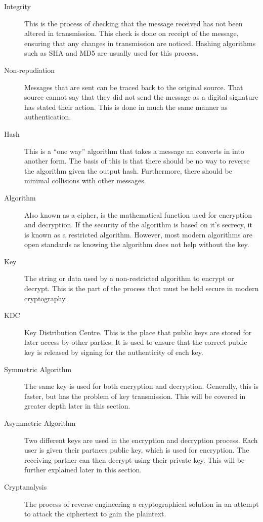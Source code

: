 \begin{description}
				\item[Integrity] 
					This is the process of checking that the message received has not been altered in transmission. 
					This check is done on receipt of the message, ensuring that any changes in transmission are noticed. 
					Hashing algorithms such as SHA and MD5 are usually used for this process. 
				\item[Non-repudiation]
					Messages that are sent can be traced back to the original source. 
					That source cannot say that they did not send the message as a digital signature has stated their action. 
					This is done in much the same manner as authentication. 
				\item[Hash]
					This is a ``one way'' algorithm that takes a message an converts in into another form. 
					The basis of this is that there should be no way to reverse the algorithm given the output hash. 
					Furthermore, there should be minimal collisions with other messages. 
				\item[Algorithm] Also known as a cipher, is the mathematical function used for encryption and decryption. 
					If the security of the algorithm is based on it's secrecy, it is known as a restricted algorithm. 
					However, most modern algorithms are open standards as knowing the algorithm does not help without the key. 
				\item[Key] The string or data used by a non-restricted algorithm to encrypt or decrypt. 
					This is the part of the process that must be held secure in modern cryptography. 
				\item[KDC] Key Distribution Centre. 
					This is the place that public keys are stored for later access by other parties. 
					It is used to ensure that the correct public key is released by signing for the authenticity of each key. 
				\item[Symmetric Algorithm] The same key is used for both encryption and decryption. 
					Generally, this is faster, but has the problem of key transmission. 
					This will be covered in greater depth later in this section. 
				\item[Asymmetric Algorithm] Two different keys are used in the encryption and decryption process. 
					Each user is given their partners public key, which is used for encryption. 
					The receiving partner can then decrypt using their private key. 
					This will be further explained later in this section. 
				\item[Cryptanalysis] The process of reverse engineering a cryptographical solution in an attempt to attack the ciphertext to gain the plaintext. 

\end{description}

